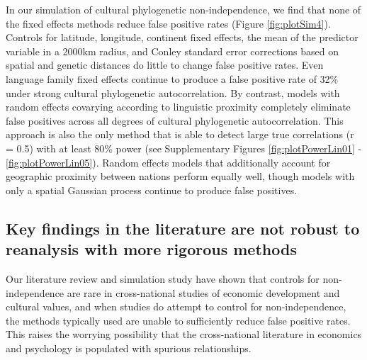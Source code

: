 \documentclass[
  man,floatsintext]{apa6}
\begin{document}
In our simulation of cultural phylogenetic non-independence, we find that none of the fixed effects methods reduce false positive rates (Figure \ref{fig:plotSim4}). Controls for latitude, longitude, continent fixed effects, the mean of the predictor variable in a 2000km radius, and Conley standard error corrections based on spatial and genetic distances do little to change false positive rates. Even language family fixed effects continue to produce a false positive rate of 32\% under strong cultural phylogenetic autocorrelation. By contrast, models with random effects covarying according to linguistic proximity completely eliminate false positives across all degrees of cultural phylogenetic autocorrelation. This approach is also the only method that is able to detect large true correlations (r = 0.5) with at least 80\% power (see Supplementary Figures \ref{fig:plotPowerLin01} - \ref{fig:plotPowerLin05}). Random effects models that additionally account for geographic proximity between nations perform equally well, though models with only a spatial Gaussian process continue to produce false positives.

\hypertarget{key-findings-in-the-literature-are-not-robust-to-reanalysis-with-more-rigorous-methods}{%
\subsection{Key findings in the literature are not robust to reanalysis with more rigorous methods}\label{key-findings-in-the-literature-are-not-robust-to-reanalysis-with-more-rigorous-methods}}

Our literature review and simulation study have shown that controls for non-independence are rare in cross-national studies of economic development and cultural values, and when studies do attempt to control for non-independence, the methods typically used are unable to sufficiently reduce false positive rates. This raises the worrying possibility that the cross-national literature in economics and psychology is populated with spurious relationships.
\end{document}

